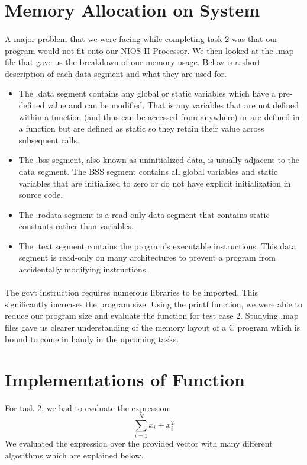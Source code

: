 \documentclass{article}
\begin{document}
\newpage
\section{Memory Allocation on System}
\paragraph{}
A major problem that we were facing while completing task \num{2} was that our program would not fit onto our NIOS II Processor. We then looked at the .map file that gave us the breakdown of our memory usage. Below is a short description of each data segment and what they are used for.
\begin{itemize}
    \item The .data segment contains any global or static variables which have a pre-defined value and can be modified. That is any variables that are not defined within a function (and thus can be accessed from anywhere) or are defined in a function but are defined as static so they retain their value across subsequent calls.
    \item The .bss segment, also known as uninitialized data, is usually adjacent to the data segment. The BSS segment contains all global variables and static variables that are initialized to zero or do not have explicit initialization in source code.
    \item The .rodata segment is a read-only data segment that contains static constants rather than variables.
    \item The .text segment contains the program's executable instructions. This data segment is read-only on many architectures to prevent a program from accidentally modifying instructions.\cite{wiki}  
\end{itemize}
\paragraph{}
The gcvt instruction requires numerous libraries to be imported. This significantly increases the program size. Using the printf function, we were able to reduce our program size and evaluate the function for test case 2. Studying .map files gave us clearer understanding of the memory layout of a C program which is bound to come in handy in the upcoming tasks. 

\newpage
\section{Implementations of Function}
For task 2, we had to evaluate the expression: 
\begin{equation}
     \sum_{i=1}^{N} x_i + x_i^2 
\end{equation} 
We evaluated the expression over the provided vector with many different algorithms which are explained below.
\end{document}

